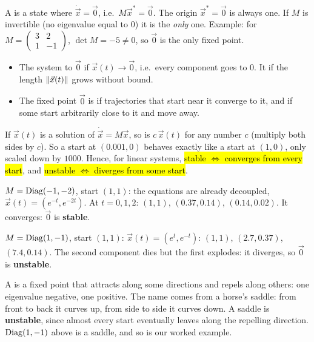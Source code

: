 \begin{defn}[Fixed point of $\dot{\vec x}=M\vec x$]
A  is a state where $\dot{\vec x}=\vec 0$, i.e.\ $M\vec x^*=\vec 0$. The origin $\vec x^*=\vec0$ is always one.
If $M$ is invertible (no eigenvalue equal to $0$) it is the \emph{only} one. Example: for $M=\begin{pmatrix}3&2\\1&-1\end{pmatrix}$, $\det M=-5\neq0$, so $\vec 0$ is the only fixed point.
\end{defn}

\begin{defn}
\begin{itemize}
  \item The system  to $\vec 0$ if $\vec x(t)\to\vec 0$, i.e.\ every component goes to $0$. It  if the length $\lVert \vec x(t)\rVert$ grows without bound.
  \item The fixed point $\vec 0$ is  if trajectories that start near it converge to it, and  if some start arbitrarily close to it and move away.
\end{itemize}
\end{defn}

\begin{intuition}
If $\vec x(t)$ is a solution of $\dot{\vec x}=M\vec x$, so is $c\,\vec x(t)$ for any number $c$ (multiply both sides by $c$). So a start at
$(0.001,0)$ behaves exactly like a start at $(1,0)$, only scaled down by $1000$. Hence, for linear systems,
\hl{stable $\iff$ converges from every start}, and \hl{unstable $\iff$ diverges from some start}.
\end{intuition}

\begin{example}
$M=\operatorname{Diag}(-1,-2)$, start $(1,1)$: the equations are already decoupled, $\vec x(t)=(e^{-t},e^{-2t})$. At $t=0,1,2$: $(1,1)$, $(0.37,0.14)$, $(0.14,0.02)$. It converges: $\vec0$ is \textbf{stable}.

$M=\operatorname{Diag}(1,-1)$, start $(1,1)$: $\vec x(t)=(e^{t},e^{-t})$: $(1,1)$, $(2.7,0.37)$, $(7.4,0.14)$. The second component dies but the first explodes: it diverges, so $\vec0$ is \textbf{unstable}.
\end{example}

\begin{defn}[Saddle]
A  is a fixed point that attracts along some directions and repels along others: one eigenvalue negative, one positive.
The name comes from a horse's saddle: from front to back it curves up, from side to side it curves down. A saddle is \textbf{unstable},
since almost every start eventually leaves along the repelling direction. $\operatorname{Diag}(1,-1)$ above is a saddle, and so is our worked example.
\end{defn}

